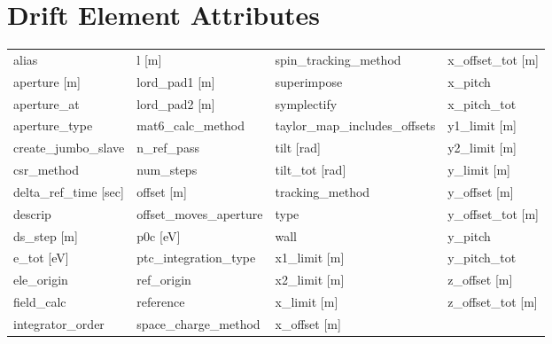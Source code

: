  \section{Drift Element Attributes}
 \label{s:list.drift}
 
 \begin{tabular}{llll} \toprule
alias                          & l [m]                          & spin_tracking_method           & x_offset_tot [m]               \\
aperture [m]                   & lord_pad1 [m]                  & superimpose                    & x_pitch                        \\
aperture_at                    & lord_pad2 [m]                  & symplectify                    & x_pitch_tot                    \\
aperture_type                  & mat6_calc_method               & taylor_map_includes_offsets    & y1_limit [m]                   \\
create_jumbo_slave             & n_ref_pass                     & tilt [rad]                     & y2_limit [m]                   \\
csr_method                     & num_steps                      & tilt_tot [rad]                 & y_limit [m]                    \\
delta_ref_time [sec]           & offset [m]                     & tracking_method                & y_offset [m]                   \\
descrip                        & offset_moves_aperture          & type                           & y_offset_tot [m]               \\
ds_step [m]                    & p0c [eV]                       & wall                           & y_pitch                        \\
e_tot [eV]                     & ptc_integration_type           & x1_limit [m]                   & y_pitch_tot                    \\
ele_origin                     & ref_origin                     & x2_limit [m]                   & z_offset [m]                   \\
field_calc                     & reference                      & x_limit [m]                    & z_offset_tot [m]               \\
integrator_order               & space_charge_method            & x_offset [m]                   &                                \\
 \bottomrule
 \end{tabular}
 \vfill
 
